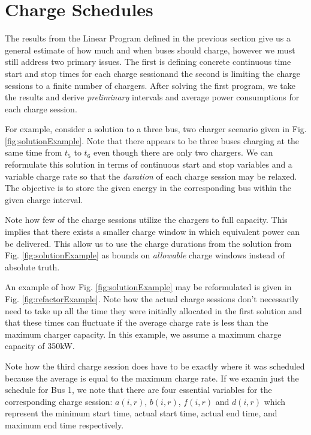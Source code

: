 



\section{Charge Schedules}
The results from the Linear Program defined in the previous section give us a general estimate of how much and when buses should charge, however we must still address two primary issues. The first is defining concrete continuous time start and stop times for each charge sessionand the second is limiting the charge sessions to a finite number of chargers. After solving the first program, we take the results and derive {\it preliminary} intervals and average power consumptions for each charge session.  
\par For example, consider a solution to a three bus, two charger scenario given in Fig. \ref{fig:solutionExample}.
Note that there appears to be three buses charging at the same time from $t_5$ to $t_6$ even though there are only two chargers.  We can reformulate this solution in terms of continuous start and stop variables and a variable charge rate so that the {\it duration} of each charge session may be relaxed. The objective is to store the given energy in the corresponding bus within the given charge interval.  
\par Note how few of the charge sessions utilize the chargers to full capacity. This implies that there exists a smaller charge window in which equivalent power can be delivered. This allow us to use the charge durations from the solution from Fig. \ref{fig:solutionExample} as bounds on {\it allowable} charge windows instead of absolute truth. 
\par An example of how Fig. \ref{fig:solutionExample} may be reformulated is given in Fig. \ref{fig:refactorExample}. Note how the actual charge sessions don't necessarily need to take up all the time they were initially allocated in the first solution and that these times can fluctuate if the average charge rate is less than the maximum charger capacity. In this example, we assume a maximum charge capacity of 350kW.  
\par Note how the third charge session does have to be exactly where it was scheduled because the average is equal to the maximum charge rate.
If we examin just the schedule for Bus 1, we note that there are four essential variables for the corresponding charge session: $a(i,r)$, $b(i,r)$, $f(i,r)$ and $d(i,r)$ which represent the minimum start time, actual start time, actual end time, and maximum end time respectively. 
